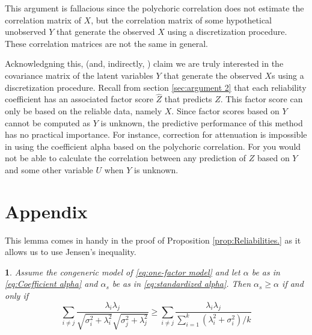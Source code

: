 \documentclass{article}
\theoremstyle{plain}
\theoremstyle{plain}
\newtheorem{lemma}{\protect\lemmaname}
\theoremstyle{definition}
\theoremstyle{remark}
\theoremstyle{definition}
\theoremstyle{plain}
\theoremstyle{plain}
\theoremstyle{definition}
\providecommand{\lemmaname}{Lemma}
\begin{document}
This argument is fallacious since the polychoric correlation does not estimate the correlation matrix of $X$, but the correlation matrix of some hypothetical unobserved $Y$ that generate the observed $X$ using a discretization procedure. These correlation matrices are not the same in general. 

Acknowledgning this, \citet[][p.2]{Gadermann2012-jl} (and, indirectly, \citet{Zumbo2007-ap}) claim we are truly interested in the covariance matrix of the latent variables $Y$ that generate the observed $X$s using a discretization procedure. Recall from section \ref{sec:argument 2} that each reliability coefficient has an associated factor score $\widehat{Z}$ that predicts $Z$. This factor score can only be based on the reliable data, namely $X$. Since factor scores based on $Y$ cannot be computed as $Y$ is unknown, the predictive performance of this method has no practical importance. For instance, correction for attenuation is impossible in using the coefficient alpha based on the polychoric correlation. For you would not be able to calculate the correlation between any prediction of $Z$ based on $Y$ and some other variable $U$ when $Y$ is unknown.

\section{Appendix}

This lemma comes in handy in the proof of Proposition \ref{prop:Reliabilities.} as it allows us to use Jensen's inequality.

\begin{lemma}
Assume the congeneric model of \eqref{eq:one-factor model} and let $\alpha$ be as in \eqref{eq:Coefficient alpha} and $\alpha_s$ be as in \eqref{eq:standardized alpha}. Then $\alpha_{s}\geq\alpha$
if and only if
\begin{equation}
\label{eq:alpha_s_alpha_inequality}
\sum_{i\neq j}\frac{\lambda_{i}\lambda_{j}}{\sqrt{\sigma_{i}^{2}+\lambda_{i}^{2}}\sqrt{\sigma_j^{2}+\lambda_{j}^{2}}} 
\geq
\sum_{i\neq j}\frac{\lambda_{i}\lambda_{j}}{\sum_{i=1}^{k}\left(\lambda_{i}^{2}+\sigma_{i}^{2}\right)/k}
\end{equation}
\end{lemma}
\end{document}
